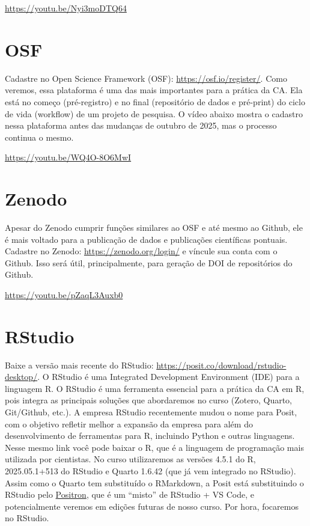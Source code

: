 \documentclass[
  a4paper,
]{book}
\begin{document}
\url{https://youtu.be/Nyi3moDTQ64}

\section*{OSF}\label{sec-osfprework}


Cadastre no Open Science Framework (OSF):
\url{https://osf.io/register/}. Como veremos, essa plataforma é uma das
mais importantes para a prática da CA. Ela está no começo (pré-registro)
e no final (repositório de dados e pré-print) do ciclo de vida
(workflow) de um projeto de pesquisa. O vídeo abaixo mostra o cadastro
nessa plataforma antes das mudanças de outubro de 2025, mas o processo
continua o mesmo.

\url{https://youtu.be/WQ4O-8O6MwI}

\section*{Zenodo}\label{sec-zenodoprework}


Apesar do Zenodo cumprir funções similares ao OSF e até mesmo ao Github,
ele é mais voltado para a publicação de dados e publicações científicas
pontuais. Cadastre no Zenodo: \url{https://zenodo.org/login/} e víncule
sua conta com o Github. Isso será útil, principalmente, para geração de
DOI de repositórios do Github.

\url{https://youtu.be/pZaqL3Auxb0}

\section*{RStudio}\label{sec-rstudioprework}


Baixe a versão mais recente do RStudio:
\url{https://posit.co/download/rstudio-desktop/}. O RStudio é uma
Integrated Development Environment (IDE) para a linguagem R. O RStudio é
uma ferramenta essencial para a prática da CA em R, pois integra as
principais soluções que abordaremos no curso (Zotero, Quarto,
Git/Github, etc.). A empresa RStudio recentemente mudou o nome para
Posit, com o objetivo refletir melhor a expansão da empresa para além do
desenvolvimento de ferramentas para R, incluindo Python e outras
linguagens. Nesse mesmo link você pode baixar o R, que é a linguagem de
programação mais utilizada por cientistas. No curso utilizaremos as
versões 4.5.1 do R, 2025.05.1+513 do RStudio e Quarto 1.6.42 (que já vem
integrado no RStudio). Assim como o Quarto tem substituído o RMarkdown,
a Posit está substituindo o RStudio pelo
\href{https://positron.posit.co/}{Positron}, que é um ``misto'' de
RStudio + VS Code, e potencialmente veremos em edições futuras de nosso
curso. Por hora, focaremos no RStudio.
\end{document}
